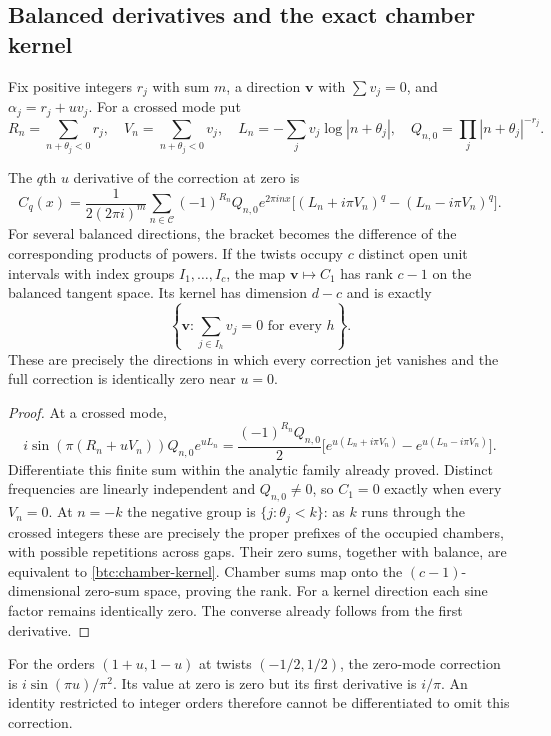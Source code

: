 \subsection{Balanced derivatives and the exact chamber kernel}
Fix positive integers $r_j$ with sum $m$, a direction $\mathbf v$ with
$\sum v_j=0$, and $\alpha_j=r_j+uv_j$. For a crossed mode put
\[
 R_n=\sum_{n+\theta_j<0}r_j,\quad
 V_n=\sum_{n+\theta_j<0}v_j,\quad
 L_n=-\sum_jv_j\log|n+\theta_j|,\quad
 Q_{n,0}=\prod_j|n+\theta_j|^{-r_j}.
\]
\begin{theorem}\label{btc:jets}
The $q$th $u$ derivative of the correction at zero is
\begin{equation}\label{btc:jet}
 C_q(x)=\frac1{2(2\pi i)^m}\sum_{n\in\mathcal C}
 (-1)^{R_n}Q_{n,0}e^{2\pi i n x}
 \bigl[(L_n+i\pi V_n)^q-(L_n-i\pi V_n)^q\bigr].
\end{equation}
For several balanced directions, the bracket becomes the difference of
the corresponding products of powers. If the twists occupy $c$ distinct
open unit intervals with index groups $I_1,\ldots,I_c$, the map
$\mathbf v\mapsto C_1$ has rank $c-1$ on the balanced tangent space.
Its kernel has dimension $d-c$ and is exactly
\begin{equation}\label{btc:chamber-kernel}
 \left\{\mathbf v:\sum_{j\in I_h}v_j=0\text{ for every }h\right\}.
\end{equation}
These are precisely the directions in which every correction jet
vanishes and the full correction is identically zero near $u=0$.
\end{theorem}
\begin{proof}
At a crossed mode,
\[
 i\sin(\pi(R_n+uV_n))Q_{n,0}e^{uL_n}
 =\frac{(-1)^{R_n}Q_{n,0}}2
    \bigl[e^{u(L_n+i\pi V_n)}-e^{u(L_n-i\pi V_n)}\bigr].
\]
Differentiate this finite sum within the analytic family already proved.
Distinct frequencies are linearly independent and $Q_{n,0}\ne0$, so
$C_1=0$ exactly when every $V_n=0$. At $n=-k$ the negative group is
$\{j:\theta_j<k\}$: as $k$ runs through the crossed integers these
are precisely the proper prefixes of the occupied chambers, with possible
repetitions across gaps. Their zero sums, together with balance, are
equivalent to \eqref{btc:chamber-kernel}. Chamber sums map onto the
$(c-1)$-dimensional zero-sum space, proving the rank. For a kernel
direction each sine factor remains identically zero. The converse
already follows from the first derivative.
\end{proof}
For the orders $(1+u,1-u)$ at twists $(-1/2,1/2)$, the zero-mode
correction is $i\sin(\pi u)/\pi^2$. Its value at zero is zero but
its first derivative is $i/\pi$. An identity restricted to integer
orders therefore cannot be differentiated to omit this correction.

